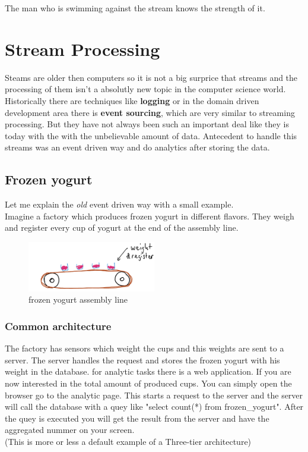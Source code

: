\begin{savequote}[75mm]
The man who is swimming against the stream knows the strength of it.
\end{savequote}

\chapter{Stream Processing}
Steams are older then computers so it is not a big surprice that streams
and the processing of them isn't a absolutly new topic in the computer science world.
Historically there are techniques like \textbf{logging} or in the domain driven development area there is \textbf{event sourcing},
which are very similar to streaming processing.
But they have not always been such an important deal like they is today with the with the unbelievable amount of data.
Antecedent to handle this streams was an event driven way and do analytics after storing the data.\\

\newpage

\section{Frozen yogurt}
Let me explain the \textit{old} event driven way with a small example.\\
Imagine a factory which produces frozen yogurt in different flavors.
They weigh and register every cup of yogurt at the end of the assembly line.\\

\begin{figure}[H]
\centering
\captionsetup{justification=centering}
\includegraphics[width=0.5\textwidth]{images/cups.png}
\caption[Frozen yogurt assembly line]{frozen yogurt assembly line}
\end{figure}

\subsection{Common architecture}
The factory has sensors which weight the cups and this weights are sent to a server.
The server handles the request and stores the frozen yogurt with his weight in the database.
for analytic tasks there is a web application. If you are now interested in the total amount of produced cups.
You can simply open the browser go to the analytic page.
This starts a request to the server and the server will call the database with a quey like "select count(*) from frozen\_yogurt".
After the quey is executed you will get the result from the server and have the aggregated nummer on your screen.\\
(This is more or less a default example of a Three-tier architecture)

